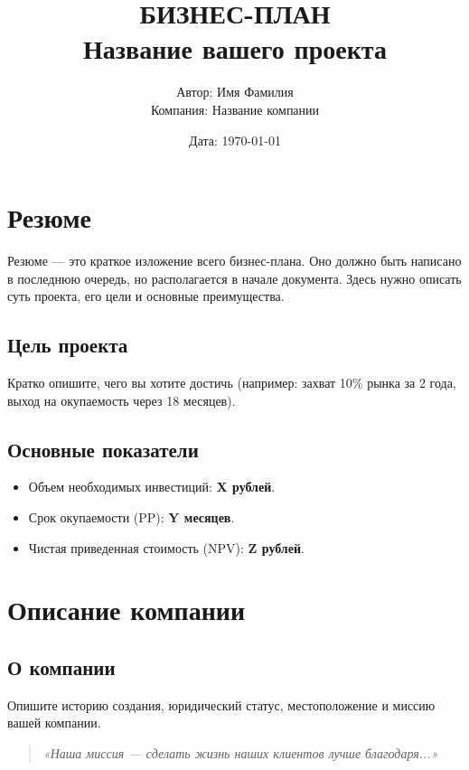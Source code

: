 \documentclass[a4paper,12pt]{article}
\title{\textbf{БИЗНЕС-ПЛАН}\\[0.5em] \large Название вашего проекта}
\author{Автор: Имя Фамилия \\ Компания: Название компании}
\date{Дата: \today}
\begin{document}
\maketitle
\thispagestyle{empty}
\newpage

\tableofcontents
\newpage

\section{Резюме}

Резюме — это краткое изложение всего бизнес-плана. Оно должно быть написано в последнюю очередь, но располагается в начале документа. Здесь нужно описать суть проекта, его цели и основные преимущества.

\subsection{Цель проекта}
Кратко опишите, чего вы хотите достичь (например: захват 10\% рынка за 2 года, выход на окупаемость через 18 месяцев).

\subsection{Основные показатели}
\begin{itemize}
    \item Объем необходимых инвестиций: \textbf{X рублей}.
    \item Срок окупаемости (PP): \textbf{Y месяцев}.
    \item Чистая приведенная стоимость (NPV): \textbf{Z рублей}.
\end{itemize}

\newpage
\section{Описание компании}

\subsection{О компании}
Опишите историю создания, юридический статус, местоположение и миссию вашей компании.

\begin{quote}
    \textit{«Наша миссия — сделать жизнь наших клиентов лучше благодаря...»}
\end{quote}
\end{document}

